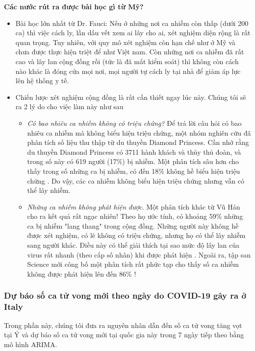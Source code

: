 \documentclass[12pt, a4paper,oneside]{book}
\theoremstyle{definition}
\begin{document}
\textbf{Các nước rút ra được bài học gì từ Mỹ?}\\
\begin{itemize}
    \item Bài học lớn nhất từ Dr. Fauci: Nếu ở những nơi ca nhiễm còn thấp (dưới 200 ca) thì việc cách ly, lần dấu vết xem ai lây cho ai, xét nghiệm diện rộng là rất quan trọng. Tuy nhiên, với quy mô xét nghiệm còn hạn chế như ở Mỹ và chưa được thực hiện triệt để như Việt nam. Còn những nơi ca nhiễm đã rất cao và lây lan cộng đồng rồi (tức là đã mất kiểm soát) thì không còn cách nào khác là đóng cửa mọi nơi, mọi người tự cách ly tại nhà để giảm áp lực lên hệ thống y tế.
   \item Chiến lược xét nghiệm cộng đồng là rất cần thiết ngay lúc này. Chúng tôi sẽ ra 2 lý do cho việc làm này như sau
\begin{itemize}
	\item \textit{Có bao nhiêu ca nhiễm không có triệu chứng?} Để trả lời câu hỏi có bao nhiêu ca nhiễm mà không biểu hiện triệu chứng, một nhóm nghiên cứu đã phân tích số liệu thu thập từ du thuyền Diamond Princess. Cần nhớ rằng du thuyền Diamond Princess có 3711 hành khách và thủy thủ đoàn, và trong số này có 619 người (17\%) bị nhiễm. Một phân tích sâu hơn cho thấy trong số những ca bị nhiễm, có đến 18\% không hề biểu hiện triệu chứng \cite{18}. Do vậy, các ca nhiễm không biểu hiện triệu chứng nhưng vẫn có thể lây nhiễm. 
	\item \textit{Những ca nhiễm không phát hiện được}. Một phân tích khác từ Vũ Hán cho ra kết quả rất ngạc nhiên! Theo họ ước tính, có khoảng 59\% những ca bị nhiễm "lang thang" trong cộng đồng. Những người này không hề được xét nghiệm, có lẽ không có triệu chứng, nhưng họ có thể lây nhiễm sang người khác. Điều này có thể giải thích tại sao mức độ lây lan của virus rất nhanh (theo cấp số nhân) khi được phát hiện \cite{19}. Ngoài ra, tập san Science mới công bố một phân tích rất phức tạp cho thấy số ca nhiễm không được phát hiện lên đến 86\% \cite{20}!
\end{itemize}
\end{itemize}
\subsubsection{Dự báo số ca tử vong mới theo ngày do COVID-19 gây ra ở Italy}
Trong phần này, chúng tôi đưa ra nguyên nhân dẫn đến số ca tử vong tăng vọt tại Ý và dự báo số ca tử vong mới tại quốc gia này trong 7 ngày tiếp theo bằng mô hình ARIMA.
\end{document}
